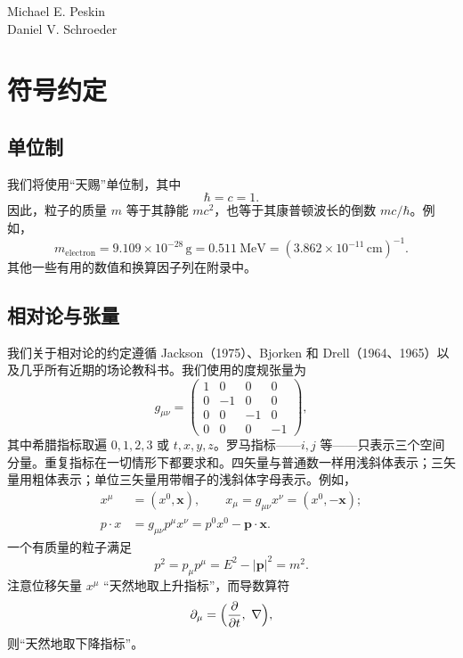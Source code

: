 \vspace{2em}
\noindent Michael E. Peskin\\
Daniel V. Schroeder

\chapter*{符号约定}

\section*{单位制}

我们将使用``天赐''单位制，其中
\begin{equation}
  \hbar = c = 1 .
\end{equation}
因此，粒子的质量 $m$ 等于其静能 $mc^2$，也等于其康普顿波长的倒数 $mc/\hbar$。例如，
\begin{equation}
  m_\mathrm{electron} = 9.109 \times 10^{-28}\,\mathrm{g}
    = 0.511\ \mathrm{MeV}
    = (3.862 \times 10^{-11}\,\mathrm{cm})^{-1} .
\end{equation}
其他一些有用的数值和换算因子列在附录中。

\section*{相对论与张量}

我们关于相对论的约定遵循 Jackson（1975）、Bjorken 和 Drell（1964、1965）以及几乎所有近期的场论教科书。我们使用的度规张量为
\begin{equation}
  g_{\mu\nu} = \begin{pmatrix}
    1 & 0 & 0 & 0\\
    0 & -1 & 0 & 0\\
    0 & 0 & -1 & 0\\
    0 & 0 & 0 & -1
  \end{pmatrix},
\end{equation}
其中希腊指标取遍 $0,1,2,3$ 或 $t,x,y,z$。罗马指标——$i,j$ 等——只表示三个空间分量。重复指标在一切情形下都要求和。四矢量与普通数一样用浅斜体表示；三矢量用粗体表示；单位三矢量用带帽子的浅斜体字母表示。例如，
\begin{align}
  x^\mu &= (x^0, \mathbf{x}),\qquad x_\mu = g_{\mu\nu} x^\nu = (x^0, -\mathbf{x});\\
  p\cdot x &= g_{\mu\nu} p^\mu x^\nu = p^0 x^0 - \mathbf{p}\cdot\mathbf{x}.
\end{align}
一个有质量的粒子满足
\begin{equation}
  p^2 = p_\mu p^\mu = E^2 - |\mathbf{p}|^2 = m^2 .
\end{equation}
注意位移矢量 $x^\mu$ ``天然地取上升指标''，而导数算符
\begin{equation}
  \partial_\mu = \Bigl( \frac{\partial}{\partial t},\ \nabla \Bigr),
\end{equation}
则``天然地取下降指标''。

